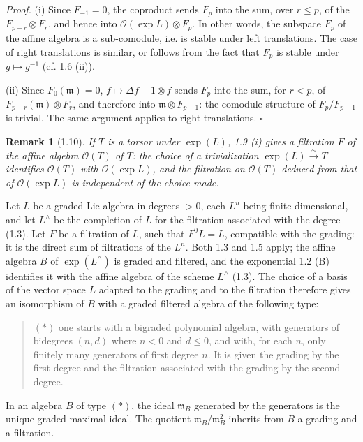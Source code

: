 \documentclass[10pt,a4paper]{article}
\newcommand{\OO}{\mathcal O}
\newcommand{\m}{\mathfrak m}
\newcommand{\Lhat}{L^{\wedge}}
\theoremstyle{deligne}
\newtheorem*{remark*}{Remark}
\newenvironment{proofdel}{\textit{Proof.}}{\hfill$\square$}
\newcommand{\heading}[1]{\vspace{0.65em}\noindent{\bfseries #1}\quad}
\begin{document}
\begin{proofdel}
(i) Since \(F_{-1}=0\), the coproduct sends \(F_p\) into the sum, over \(r\le p\), of the \(F_{p-r}\otimes F_r\), and hence into \(\OO(\exp L)\otimes F_p\). In other words, the subspace \(F_p\) of the affine algebra is a sub-comodule, i.e. is stable under left translations. The case of right translations is similar, or follows from the fact that \(F_p\) is stable under \(g\mapsto g^{-1}\) (cf. 1.6 (ii)).

(ii) Since \(F_0(\m)=0\), \(f\mapsto\Delta f-1\otimes f\) sends \(F_p\) into the sum, for \(r<p\), of \(F_{p-r}(\m)\otimes F_r\), and therefore into \(\m\otimes F_{p-1}\): the comodule structure of \(F_p/F_{p-1}\) is trivial. The same argument applies to right translations.
\end{proofdel}

\begin{remark*}[1.10]
If \(T\) is a torsor under \(\exp(L)\), 1.9 (i) gives a filtration \(F\) of the affine algebra \(\OO(T)\) of \(T\): the choice of a trivialization \(\exp(L)\overset{\sim}{\to}T\) identifies \(\OO(T)\) with \(\OO(\exp L)\), and the filtration on \(\OO(T)\) deduced from that of \(\OO(\exp L)\) is independent of the choice made.
\end{remark*}

\heading{1.11.} Let \(L\) be a graded Lie algebra in degrees \(>0\), each \(L^n\) being finite-dimensional, and let \(\Lhat\) be the completion of \(L\) for the filtration associated with the degree (1.3). Let \(F\) be a filtration of \(L\), such that \(F^0L=L\), compatible with the grading: it is the direct sum of filtrations of the \(L^n\). Both 1.3 and 1.5 apply; the affine algebra \(B\) of \(\exp(\Lhat)\) is graded and filtered, and the exponential 1.2 (B) identifies it with the affine algebra of the scheme \(\Lhat\) (1.3). The choice of a basis of the vector space \(L\) adapted to the grading and to the filtration therefore gives an isomorphism of \(B\) with a graded filtered algebra of the following type:

\begin{quote}
\((*)\) one starts with a bigraded polynomial algebra, with generators of bidegrees \((n,d)\) where \(n<0\) and \(d\le0\), and with, for each \(n\), only finitely many generators of first degree \(n\). It is given the grading by the first degree and the filtration associated with the grading by the second degree.
\end{quote}

In an algebra \(B\) of type \((*)\), the ideal \(\m_B\) generated by the generators is the unique graded maximal ideal. The quotient \(\m_B/\m_B^2\) inherits from \(B\) a grading and a filtration.
\end{document}

